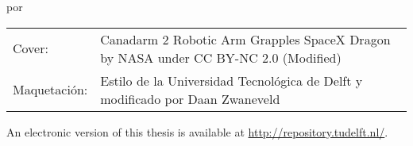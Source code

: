 \begin{titlepage}

\begin{center}

{\makeatletter
\largetitlestyle\fontsize{45}{45}\selectfont\@title
\makeatother}

{\makeatletter
\ifdefvoid{\@subtitle}{}{\bigskip\fontsize{20}{20}\selectfont\@subtitle}
\makeatother}

\bigskip
\bigskip

por

\bigskip
\bigskip

{\makeatletter
\largetitlestyle\fontsize{25}{25}\selectfont\@author
\makeatother}


\vfill



\begin{tabular}{p{15mm}p{10cm}}
    Cover: & Canadarm 2 Robotic Arm Grapples SpaceX Dragon by NASA under CC BY-NC 2.0 (Modified) \\
    Maquetación: & Estilo de la Universidad Tecnológica de Delft y modificado por Daan Zwaneveld
\end{tabular}

\bigskip
\bigskip
An electronic version of this thesis is available at \url{http://repository.tudelft.nl/}.

\end{center}


\end{titlepage}
